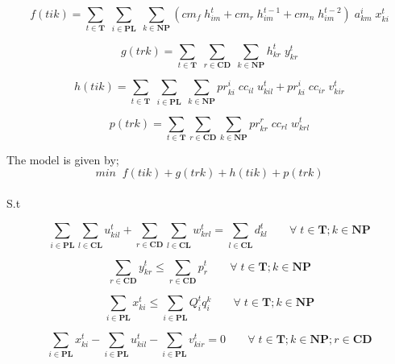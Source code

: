 \documentclass{article}
\begin{document}
\begin{equation}
 f(tik)=\sum_{t\in \textbf{T}}\;\sum_{i\in \textbf{PL}}\;\sum_{k\in \textbf{NP}}({cm}_{f}\;{h}_{im}^{t}+{cm}_{r}\;{h}_{im}^{t-1}+{cm}_{n}\;{h}_{im}^{t-2})\;{a}_{km}^{i}\;{x}_{ki}^{t}
\end{equation}
    
\begin{equation}
g(trk)=\sum_{t\in \textbf{T}}\;\sum_{r\in \textbf{CD}}\;\sum_{k\in \textbf{NP}} 
{h}_{kr}^{t}\;{y}_{kr}^{t}    
\end{equation}

\begin{equation}
h(tik)=\sum_{t\in \textbf{T}}\;\sum_{i\in \textbf{PL}}\;\sum_{k\in \textbf{NP}} 
{pr}_{ki}^{i}\;{cc}_{il}\;{u}_{kil}^{t}+{pr}_{ki}^{i}\;{cc}_{ir}\;{v}_{kir}^{t}   
\end{equation}

\begin{equation}
p(trk)=\sum_{t\in \textbf{T}}\sum_{r\in \textbf{CD}}\sum_{k\in \textbf{NP}} 
{pr}_{kr}^{r}\;{cc}_{rl}\;{w}_{krl}^{t}
\end{equation}

The model is given by;
\begin{equation}
min\;\;f(tik)+g(trk)+h(tik)+p(trk)   
\label{min3}
\end{equation}
\\
S.t

\begin{equation}
\sum_{i\in \textbf{PL}}\!\sum_{l\in \textbf{CL}}{u}_{kil}^{t}+
\sum_{r\in \textbf{CD}}\!\sum_{l\in \textbf{CL}}{w}_{krl}^{t}=
\sum_{l\in \textbf{CL}} {d}_{kl}^{t}\;\;\;\;\;\;\;
\forall\; t\in \textbf{T};k\in \textbf{NP}
\label{r1}
\end{equation}

\begin{equation}
\sum_{r\in \textbf{CD}}{y}_{kr}^{t}\leq
\sum_{r\in \textbf{CD}}{p}_{r}^{t}\;\;\;\;\;\;\;
\forall\; t\in \textbf{T};k\in \textbf{NP}
\label{r2}
\end{equation}

\begin{equation}
\sum_{i\in \textbf{PL}}{x}_{ki}^{t}\leq
\sum_{i\in \textbf{PL}}{Q}_{i}^{t}{q}_{i}^{k}\;\;\;\;\;\;\;
\forall\; t\in \textbf{T};k\in \textbf{NP}
\label{r3}
\end{equation}

\begin{equation}
\sum_{i\in \textbf{PL}}{x}_{ki}^{t}-
\sum_{i\in \textbf{PL}}{u}_{kil}^{t}-
\sum_{i\in \textbf{PL}}{v}_{kir}^{t}=0\;\;\;\;\;\;\;
\forall\; t\in \textbf{T};k\in \textbf{NP};r\in \textbf{CD}
\label{r4}
\end{equation}
\end{document}
